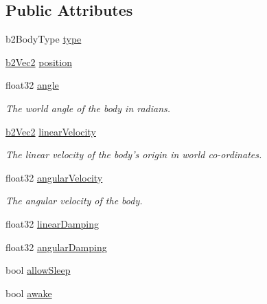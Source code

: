 \subsection*{Public Attributes}
\begin{DoxyCompactItemize}
\item 
b2\-Body\-Type \hyperlink{structb2_body_def_a89cc3ad1873908042b002147b3861381}{type}
\item 
\hyperlink{structb2_vec2}{b2\-Vec2} \hyperlink{structb2_body_def_a680cadc09ad6cf4b3366cbf0914c648b}{position}
\item 
\hypertarget{structb2_body_def_a564b16f4f8e9fcb5dda397e64aa9be6f}{float32 \hyperlink{structb2_body_def_a564b16f4f8e9fcb5dda397e64aa9be6f}{angle}}\label{structb2_body_def_a564b16f4f8e9fcb5dda397e64aa9be6f}

\begin{DoxyCompactList}\small\item\em The world angle of the body in radians. \end{DoxyCompactList}\item 
\hypertarget{structb2_body_def_a25fa5aa78d93159c344241af95bec2bf}{\hyperlink{structb2_vec2}{b2\-Vec2} \hyperlink{structb2_body_def_a25fa5aa78d93159c344241af95bec2bf}{linear\-Velocity}}\label{structb2_body_def_a25fa5aa78d93159c344241af95bec2bf}

\begin{DoxyCompactList}\small\item\em The linear velocity of the body's origin in world co-\/ordinates. \end{DoxyCompactList}\item 
\hypertarget{structb2_body_def_add7809f7a29656b8c4b643ad8c2f34a9}{float32 \hyperlink{structb2_body_def_add7809f7a29656b8c4b643ad8c2f34a9}{angular\-Velocity}}\label{structb2_body_def_add7809f7a29656b8c4b643ad8c2f34a9}

\begin{DoxyCompactList}\small\item\em The angular velocity of the body. \end{DoxyCompactList}\item 
float32 \hyperlink{structb2_body_def_a728f6df3be7dedb331455105e3659d46}{linear\-Damping}
\item 
float32 \hyperlink{structb2_body_def_a01b8dc8ad9f0962efef9e4a8e836feb6}{angular\-Damping}
\item 
bool \hyperlink{structb2_body_def_a0765068172e521ed63cb34084c59c003}{allow\-Sleep}
\item 
\hypertarget{structb2_body_def_a17a8102638aac41e7ab94278651a45bd}{bool \hyperlink{structb2_body_def_a17a8102638aac41e7ab94278651a45bd}{awake}}\label{structb2_body_def_a17a8102638aac41e7ab94278651a45bd}


\end{DoxyCompactItemize}
